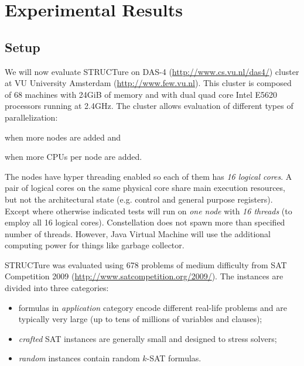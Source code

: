 \chapter{Experimental Results}
\label{chap:results}

\newcommand{\plot}[1]{
  \subfigure{
    \texttt{[image: data/all/\#1]}
  }

  \subfigure{
    \texttt{[image: data/random/\#1]}
  }

  \subfigure{
    \texttt{[image: data/nonrandom/\#1]}
  }
}

\section{Setup}

We will now evaluate STRUCTure on DAS-4 (\url{http://www.cs.vu.nl/das4/})
cluster at VU University Amsterdam (\url{http://www.few.vu.nl}).
This cluster is composed of 68 machines with 24GiB of memory and with
dual quad core Intel E5620 processors running at 2.4GHz. The
cluster allows evaluation of different types of parallelization:
\begin{inparaenum}[1)]
  \item when more nodes are added and
  \item when more CPUs per node are added.
\end{inparaenum}

The nodes have hyper threading enabled so each of them has \emph{16
logical cores}. A pair of logical cores on the same physical core
share main execution resources, but not the architectural state
(e.g. control and general purpose registers).  Except where otherwise
indicated tests will run on \emph{one node} with \emph{16 threads}
(to employ all 16 logical cores). Constellation does not spawn more
than specified number of threads. However, Java Virtual Machine will
use the additional computing power for things like garbage collector.

STRUCTure was evaluated using 678 problems
of medium difficulty from SAT Competition 2009
(\url{http://www.satcompetition.org/2009/}). The instances are
divided into three categories:
\begin{itemize}
  \item formulas in \emph{application} category encode different
  real-life problems and are typically very large (up to tens of
  millions of variables and clauses);
  \item \emph{crafted} SAT instances are generally small and designed
  to stress solvers;
  \item \emph{random} instances contain random $k$-SAT formulas.
\end{itemize}


